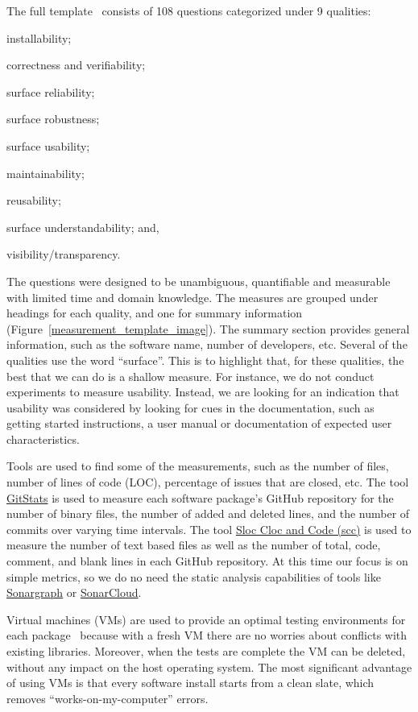 \documentclass[runningheads]{llncs}
\begin{document}
The full template~\cite{SmithEtAl2021} consists of 108 questions categorized
under 9 qualities:
\begin{inparaenum}[(i)]
	\item installability;
	\item correctness and verifiability;
	\item surface reliability;
	\item surface robustness;
	\item surface usability;
	\item maintainability;
	\item reusability;
	\item surface understandability; and,
	\item visibility/transparency. 
\end{inparaenum} 

The questions were designed to be unambiguous, quantifiable and measurable with
limited time and domain knowledge. The measures are grouped under headings for
each quality, and one for summary information
(Figure~\ref{measurement_template_image}).   The summary section provides
general information, such as the software name, number of developers, etc.
Several of the qualities use the word ``surface''.  This is to highlight that,
for these qualities, the best that we can do is a shallow measure. For instance,
we do not conduct experiments to measure usability. Instead, we are looking for
an indication that usability was considered by looking for cues in the
documentation, such as getting started instructions, a user manual or
documentation of expected user characteristics.

Tools are used to find some of the measurements, such as the number of files,
number of lines of code (LOC), percentage of issues that are closed, etc. The
tool \href{https://github.com/tomgi/git_stats}{GitStats} is used to measure each
software package's GitHub repository for the number of binary files, the number
of added and deleted lines, and the number of commits over varying time
intervals. The tool \href{https://github.com/boyter/scc}{Sloc Cloc and Code
(scc)} is used to measure the number of text based files as well as the number
of total, code, comment, and blank lines in each GitHub repository.  At this
time our focus is on simple metrics, so we do no need the static analysis
capabilities of tools like
\href{https://www.hello2morrow.com/products/sonargraph} {Sonargraph} or
\href{https://www.sonarcloud.io}{SonarCloud}.

Virtual machines (VMs) are used to provide an optimal testing environments for
each package~\cite{SmithEtAl2016} because with a fresh VM there are no worries
about conflicts with existing libraries. Moreover, when the tests are complete
the VM can be deleted, without any impact on the host operating system. The most
significant advantage of using VMs is that every software install starts from a
clean slate, which removes ``works-on-my-computer'' errors.
\end{document}
